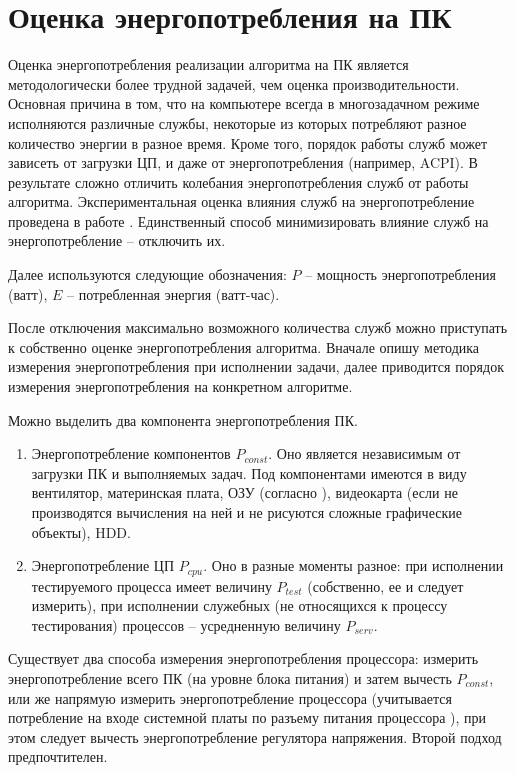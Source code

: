 \section{Оценка энергопотребления на ПК} \label{ch3:sec3}

Оценка энергопотребления реализации алгоритма на ПК является методологически более трудной задачей, чем оценка производительности. Основная причина в том, что на компьютере всегда в многозадачном режиме исполняются различные службы, некоторые из которых потребляют разное количество энергии в разное время. Кроме того, порядок работы служб может зависеть от загрузки ЦП, и даже от энергопотребления (например, ACPI). В результате сложно отличить колебания энергопотребления служб от работы алгоритма. Экспериментальная оценка влияния служб на энергопотребление проведена в работе \cite{src65}. Единственный способ минимизировать влияние служб на энергопотребление – отключить их.

Далее используются следующие обозначения: $P$ – мощность энергопотребления (ватт), $E$ – потребленная энергия (ватт-час).

После отключения максимально возможного количества служб можно приступать к собственно оценке энергопотребления алгоритма. Вначале опишу методика измерения энергопотребления при исполнении задачи, далее приводится порядок измерения энергопотребления на конкретном алгоритме.

Можно выделить два компонента энергопотребления ПК.
\begin{enumerate}
	\item Энергопотребление компонентов $P_{const}$.  Оно является независимым от загрузки ПК и выполняемых задач. Под компонентами имеются в виду вентилятор, материнская плата, ОЗУ (согласно  ), видеокарта (если не производятся вычисления на ней и не рисуются сложные графические объекты), HDD.
	\item Энергопотребление ЦП $P_{cpu}$. Оно в разные моменты разное: при исполнении тестируемого процесса имеет величину $P_{test}$ (собственно, ее и следует измерить), при исполнении служебных (не относящихся к процессу тестирования) процессов – усредненную величину $P_{serv}$.
\end{enumerate} 

Существует два способа измерения энергопотребления процессора: измерить энергопотребление всего ПК (на уровне блока питания) и затем вычесть $P_{const}$, или же напрямую измерить энергопотребление процессора \cite{src66} \cite{src67} (учитывается потребление на входе системной платы по разъему питания процессора \cite{src68}), при этом следует вычесть энергопотребление регулятора напряжения. Второй подход предпочтителен.

